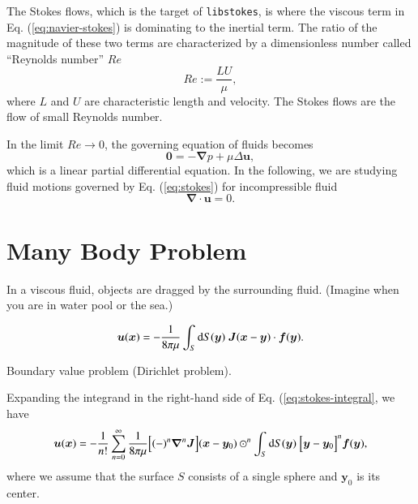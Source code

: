 \documentclass{book}
\begin{document}
The Stokes flows, which is the target of {\tt libstokes},
is where the viscous term in Eq. (\ref{eq:navier-stokes})
is dominating to the inertial term.
The ratio of the magnitude of these two terms are characterized
by a dimensionless number called ``Reynolds number'' $Re$
\begin{equation}
  Re
  :=
  \frac{LU}{\mu}
  ,
\end{equation}
where $L$ and $U$ are characteristic length and velocity.
The Stokes flows are the flow of small Reynolds number.

In the limit $Re\rightarrow 0$,
the governing equation of fluids becomes
\begin{equation}
  \bm{0}
  =
  -
  \bm{\nabla}
  p
  +
  \mu
  \Delta
  \bm{u}
  ,
  \label{eq:stokes}
\end{equation}
which is a linear partial differential equation.
In the following, we are studying fluid motions
governed by Eq. (\ref{eq:stokes})
for incompressible fluid
\begin{equation}
  \bm{\nabla}
  \cdot
  \bm{u}
  =
  0
  .
\end{equation}


\section{Many Body Problem}
In a viscous fluid, objects are dragged by the surrounding fluid.
(Imagine when you are in water pool or the sea.)


\begin{equation}
  \bm{u}
  (\bm{x})
  =
  -
  \frac{1}{8\pi\mu}
  \int_S
  {\rm d}S(\bm{y})\ 
  \bm{J}(\bm{x}-\bm{y})
  \cdot
  \bm{f}(\bm{y})
  .
  \label{eq:stokes-integral}
\end{equation}

Boundary value problem (Dirichlet problem).

Expanding the integrand in the right-hand side
of Eq. (\ref{eq:stokes-integral},
we have
\begin{equation}
  \bm{u}
  (\bm{x})
  =
  -
  \frac{1}{n!}
  \sum_{n=0}^{\infty}
  \frac{1}{8\pi\mu}
  \Bigl[
    (-)^n
    \bm{\nabla}^n
    \bm{J}
  \Bigr]
  (\bm{x}-\bm{y}_0)
  \odot^n
  \int_S
  {\rm d}S(\bm{y})\ 
  \Bigl[
    \bm{y}
    -
    \bm{y}_0
  \Bigr]^n
  \bm{f}(\bm{y})
  ,
\end{equation}
where we assume that the surface $S$ consists of a single sphere
and $\bm{y}_0$ is its center.
\end{document}

